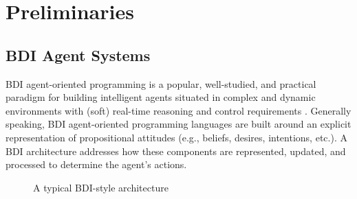 \section{Preliminaries}\label{sec:preliminaries}

\newcommand{\success}{\mbox{\emph{succ}}}
\newcommand{\failure}{\mbox{\emph{fail}}}

\newcommand{\procedurefont}[1]{\mathsf{#1}}
\newcommand{\StableGoal}{\procedurefont{StableGoal}}
\newcommand{\RecordTrace}{\procedurefont{RecordFailedTrace}}
\newcommand{\RecordWorldDT}{\procedurefont{RecordWorldDT}}



\subsection{BDI Agent Systems}\label{sec:bdi_programming}

BDI agent-oriented programming is a popular, well-studied, and practical paradigm
for building intelligent agents situated in complex and dynamic environments with
(soft) real-time reasoning and control requirements
\cite{Georgeff89-PRS,Benfield:AAMAS06}.
Generally speaking, BDI agent-oriented programming languages are built
around an 
explicit representation of propositional attitudes (e.g., beliefs, desires,
intentions, etc.). A BDI architecture addresses how these components are
represented, updated, and processed to determine the agent's actions.


\begin{figure}[t]
\begin{center}
\resizebox{.7\textwidth}{!}{}
\end{center}
\caption{A typical BDI-style architecture}
\label{fig:bdiarch}
\end{figure}

